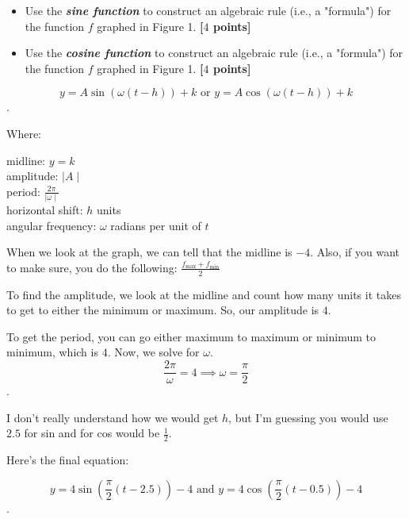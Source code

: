 \begin{problem}
  \begin{figure}[H]
    \centering


    \caption{}
  \end{figure}

  \begin{itemize}
    \item Use the \textbf{\textit{sine function}} to construct an algebraic rule
      (i.e., a "formula") for the function $f$ graphed in Figure 1. \textbf{[$4$
      points]}
    \item Use the \textbf{\textit{cosine function}} to construct an algebraic
      rule (i.e., a "formula") for the function $f$ graphed in Figure 1.
      \textbf{[$4$ points]}
  \end{itemize}
\end{problem}

\begin{solution}
  \[
  y = A\sin(\omega(t - h)) + k \textrm{ or } y = A\cos(\omega(t - h)) + k
  \].

  Where:
  \begin{center}
    midline: $y = k$ \\
    amplitude:  $\mid A \mid$ \\
    period: $\frac{2\pi}{\mid \omega \mid}$ \\
    horizontal shift: $h$ units \\
    angular frequency: $\omega$ radians per unit of $t$
  \end{center}

  When we look at the graph, we can tell that the midline is $-4$. Also, if
  you want to make sure, you do the following:
  $\frac{f_{\textrm{max}} + f_{\textrm{min}}}{2}$

  To find the amplitude, we look at the midline and count how many units it
  takes to get to either the minimum or maximum. So, our amplitude is $4$.

  To get the period, you can go either maximum to maximum or minimum to
  minimum, which is $4$. Now, we solve for $\omega$.
  \[
  \frac{2\pi}{\omega} = 4 \implies \omega = \frac{\pi}{2}
  \].

  I don't really understand how we would get $h$, but I'm guessing you would
  use $2.5$ for sin and for cos would be $\frac{1}{2}$.

  Here's the final equation:

  \[
  y = 4\sin \left(\frac{\pi}{2}(t - 2.5)\right) - 4 \textrm{ and }
  y = 4\cos \left(\frac{\pi}{2}(t - 0.5)\right) - 4
  \].
\end{solution}

